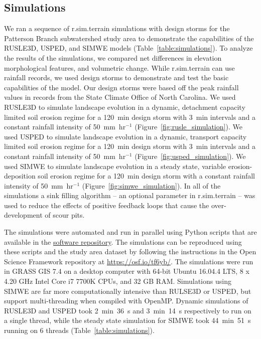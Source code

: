 \documentclass[gmd, manuscript]{copernicus}
\begin{document}
\subsection{Simulations}
%
We ran a sequence of r.sim.terrain simulations 
with design storms
for the Patterson Branch subwatershed study area
to demonstrate the capabilities 
of the RUSLE3D, USPED, and SIMWE models
(Table~\ref{table:simulations}).
%
To analyze the results of the simulations,
we compared 
net differences in elevation
morphological features,
and volumetric change.
%
While r.sim.terrain can use rainfall records,
we used design storms to demonstrate and test 
the basic capabilities of the model. 
Our design storms were based off the peak rainfall values
in records from the State Climate Office of North Carolina.
We used RUSLE3D to simulate landscape evolution
in a dynamic, detachment capacity limited soil erosion regime
for a 120~\unit{min} design storm
with 3~\unit{min} intervals 
and a constant rainfall intensity of 50~\unit{mm~hr}$^{-1}$
(Figure~\ref{fig:rusle_simulation}).
%
We used USPED to simulate landscape evolution
in a dynamic, transport capacity limited soil erosion regime
for a 120~\unit{min} design storm
with 3~\unit{min} intervals 
and a constant rainfall intensity of 50~\unit{mm~hr}$^{-1}$
(Figure~\ref{fig:usped_simulation}).
%
We used SIMWE to simulate landscape evolution
in a steady state, variable erosion-deposition soil erosion regime
for a 120~\unit{min} design storm
with a constant rainfall intensity of 50~\unit{mm~hr}$^{-1}$
(Figure~\ref{fig:simwe_simulation}). 
%
In all of the simulations 
a sink filling algorithm
-- an optional parameter in r.sim.terrain -- 
was used to reduce the effects of positive feedback loops
that cause the over-development of scour pits. 

The simulations were automated and run in parallel
using Python scripts that are available in the 
\href{https://github.com/baharmon/landscape_evolution}{software repository}.
The simulations can be reproduced using these scripts
and the study area dataset 
by following the instructions 
in the Open Science Framework repository 
at \url{https://osf.io/tf6yb/}.
The simulations were run 
in GRASS GIS 7.4 
on a desktop computer 
with 64-bit Ubuntu 16.04.4 LTS,
8 x 4.20 GHz Intel Core i7 7700K CPUs,
and 32 GB RAM. 
Simulations using SIMWE 
are far more computationally intensive
than RULSE3D or USPED, 
but support multi-threading 
when compiled with OpenMP. 
Dynamic simulations of RUSLE3D and USPED took
2~\unit{min}~36~\unit{s} and 
3~\unit{min}~14~\unit{s} respectively
to run on a single thread, 
while the steady state simulation for SIMWE took 
44~\unit{min}~51~\unit{s} running on 6 threads
(Table~\ref{table:simulations}).
\end{document}
